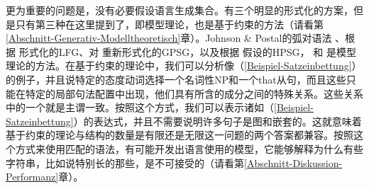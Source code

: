 更为重要的问题是，没有必要假设语言生成集合。有三个明显的形式化的方案，但是只有第三种在这里提到了，即模型理论，也是基于约束的方法（请看第\ref{Abschnitt-Generativ-Modelltheoretisch}章）。Johnson \& Postal的弧对语法
\citeyearpar{JP80a-u}、根据 \citet{Kaplan95a}形式化的LFG\indexlfgc、对 \citet{Rogers97a}重新形式化的GPSG\indexgpsg，以及根据 \citet{King99a-u}假设的HPSG\indexhpsgc， \citet{Pollard99a}和 \citet{Richter2007a}是模型理论的方法。在基于约束的理论中，我们可以分析像（\ref{Beispiel-Satzeinbettung}）的例子，并且说特定的态度动词选择一个名词性NP和一个that从句，而且这些只能在特定的局部句法配置中出现，他们具有所含的成分之间的特殊关系。这些关系中的一个就是主谓一致。按照这个方式，我们可以表示诸如（\ref{Beispiel-Satzeinbettung}）的表达式，并且不需要说明许多句子是图和嵌套的。这就意味着基于约束的理论与结构的数量是有限还是无限这一问题的两个答案都兼容。按照这个方式来使用匹配的语法，有可能开发出语言使用的模型，它能够解释为什么有些字符串，比如说特别长的那些，是不可接受的（请看第\ref{Abschnitt-Diskussion-Performanz}章）。

